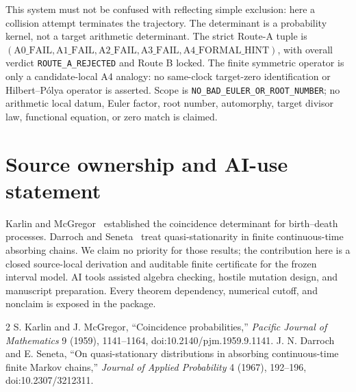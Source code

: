 \documentclass[10pt]{article}
\newcommand{\1}{\mathbf 1}
\begin{document}
This system must not be confused with reflecting simple exclusion: here a
collision attempt terminates the trajectory.  The determinant is a
probability kernel, not a target arithmetic determinant.  The strict Route-A
tuple is
$(\mathrm{A0\_FAIL},\mathrm{A1\_FAIL},\mathrm{A2\_FAIL},
\mathrm{A3\_FAIL},\mathrm{A4\_FORMAL\_HINT})$, with overall verdict
\texttt{ROUTE\_A\_REJECTED} and Route B locked.  The finite symmetric
operator is only a candidate-local A4 analogy: no same-clock target-zero
identification or Hilbert--P\'olya operator is asserted.  Scope is
\texttt{NO\_BAD\_EULER\_OR\_ROOT\_NUMBER}; no arithmetic local datum,
Euler factor, root number, automorphy, target divisor law, functional
equation, or zero match is claimed.
\fi

\section*{Source ownership and AI-use statement}
Karlin and McGregor~\cite{KM} established the coincidence determinant for
birth--death processes.  Darroch and Seneta~\cite{DS} treat
quasi-stationarity in finite continuous-time absorbing chains.  We claim no
priority for those results; the contribution here is a closed source-local
derivation and auditable finite certificate for the frozen interval model.
AI tools assisted algebra checking, hostile mutation design, and manuscript
preparation.  Every theorem dependency, numerical cutoff, and nonclaim is
exposed in the package.

\begin{thebibliography}{2}
 S. Karlin and J. McGregor, ``Coincidence probabilities,''
\emph{Pacific Journal of Mathematics} 9 (1959), 1141--1164,
doi:10.2140/pjm.1959.9.1141.
 J. N. Darroch and E. Seneta, ``On quasi-stationary distributions
in absorbing continuous-time finite Markov chains,'' \emph{Journal of
Applied Probability} 4 (1967), 192--196, doi:10.2307/3212311.
\end{thebibliography}
\end{document}
